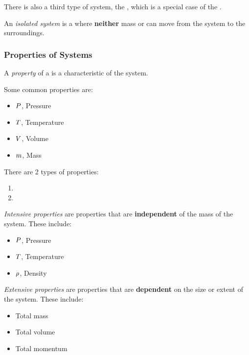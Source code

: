There is also a third type of system, the , which is a special case of the .
\begin{definition}\label{def:Isolated_System}
  An \emph{isolated system} is a  where \textbf{neither} mass or  can move from the system to the surroundings.
\end{definition}

\subsubsection{Properties of Systems}\label{subsubsec:Properties_Systems}
\begin{definition}[Property]\label{def:Property}
  A \emph{property} of a  is a characteristic of the system.
\end{definition}

Some common properties are:
\begin{itemize}[noitemsep]
\item $P$, Pressure
\item $T$, Temperature
\item $V$, Volume
\item $m$, Mass
\end{itemize}

There are 2 types of properties:
\begin{enumerate}[noitemsep]
\item {}
\item {}
\end{enumerate}

\begin{definition}\label{def:Intensive_Property}
  \emph{Intensive properties} are properties that are \textbf{independent} of the mass of the system.
  These include:
  \begin{itemize}[noitemsep]
  \item $P$, Pressure
  \item $T$, Temperature
  \item $\rho$, Density
  \end{itemize}
\end{definition}

\begin{definition}\label{def:Extensive_Property}
  \emph{Extensive properties} are properties that are \textbf{dependent} on the size or extent of the system.
  These include:
  \begin{itemize}[noitemsep]
  \item Total mass
  \item Total volume
  \item Total momentum
  \end{itemize}
\end{definition}


